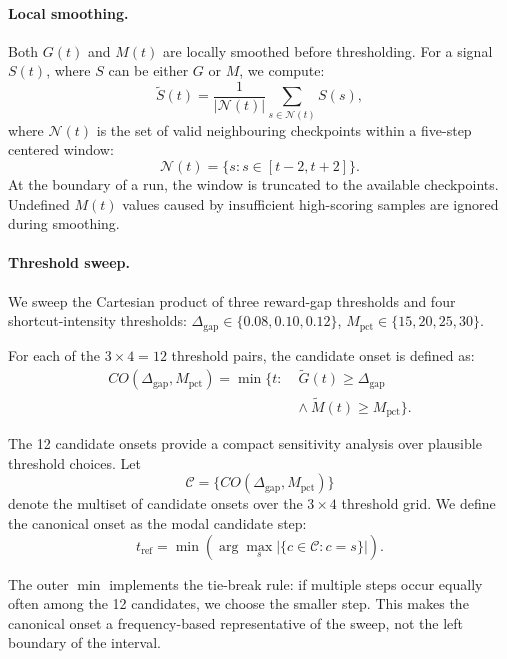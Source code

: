 \documentclass{llmxive}
\begin{document}
\paragraph{Local smoothing.}
Both \(G(t)\) and \(M(t)\) are locally smoothed before thresholding. For a signal \(S(t)\), where \(S\) can be either \(G\) or \(M\), we compute:
\begin{equation}
\widetilde{S}(t)=
\frac{1}{|\mathcal{N}(t)|}
\sum_{s\in \mathcal{N}(t)} S(s),
\end{equation}
where \(\mathcal{N}(t)\) is the set of valid neighbouring checkpoints within a five-step centered window:
\[
\mathcal{N}(t)=\{s:s\in[t-2,t+2]\}.
\]
At the boundary of a run, the window is truncated to the available checkpoints. Undefined \(M(t)\) values caused by insufficient high-scoring samples are ignored during smoothing.

\paragraph{Threshold sweep.}
We sweep the Cartesian product of three reward-gap thresholds and four shortcut-intensity thresholds:
$\Delta_{\mathrm{gap}} \in \{0.08, 0.10, 0.12\}$, $M_{\mathrm{pct}} \in \{15, 20, 25, 30\}$.

For each of the \(3\times4=12\) threshold pairs, the candidate onset is defined as:
\begin{equation}
\begin{aligned}
CO(\Delta_{\mathrm{gap}},M_{\mathrm{pct}})
=\min\{t:\;&\widetilde{G}(t)\ge\Delta_{\mathrm{gap}} \\
&\land\ \widetilde{M}(t)\ge M_{\mathrm{pct}}\}.
\end{aligned}
\end{equation}

The 12 candidate onsets provide a compact sensitivity analysis over plausible threshold choices. Let
\[
\mathcal{C}=\{CO(\Delta_{\mathrm{gap}},M_{\mathrm{pct}})\}
\]
denote the multiset of candidate onsets over the \(3\times4\) threshold grid. We define the canonical onset as the modal candidate step:
\begin{equation}
t_{\mathrm{ref}}
=
\min\left(
\arg\max_{s}
\left|\{c\in\mathcal{C}:c=s\}\right|
\right).
\end{equation}

The outer \(\min\) implements the tie-break rule: if multiple steps occur equally often among the 12 candidates, we choose the smaller step. This makes the canonical onset a frequency-based representative of the sweep, not the left boundary of the interval.
\end{document}
